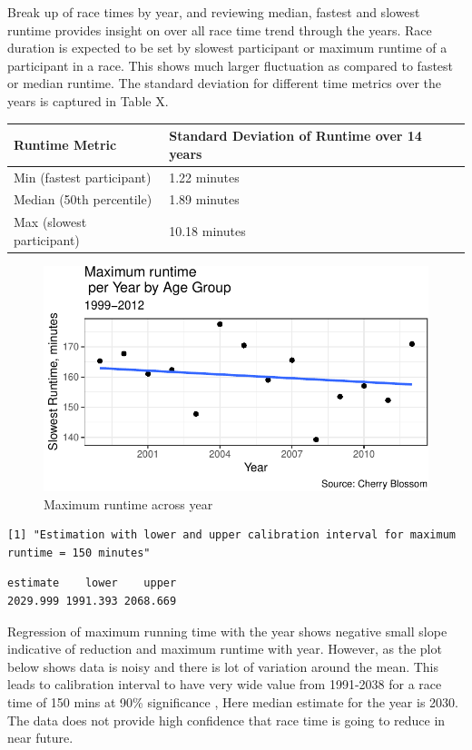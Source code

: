 \documentclass[
]{article}
\begin{document}
Break up of race times by year, and reviewing median, fastest and
slowest runtime provides insight on over all race time trend through the
years. Race duration is expected to be set by slowest participant or
maximum runtime of a participant in a race. This shows much larger
fluctuation as compared to fastest or median runtime. The standard
deviation for different time metrics over the years is captured in Table
X.

\begin{longtable}[]{@{}ll@{}}
\toprule
Runtime Metric & Standard Deviation of Runtime over 14
years\tabularnewline
\midrule
\endhead
Min (fastest participant) & 1.22 minutes\tabularnewline
Median (50th percentile) & 1.89 minutes\tabularnewline
Max (slowest participant) & 10.18 minutes\tabularnewline
\bottomrule
\end{longtable}

\begin{figure}[H]

{\centering \includegraphics{case_study02_files/figure-latex/unnamed-chunk-20-1} 

}

\caption{Maximum runtime across year}\label{fig:unnamed-chunk-20}
\end{figure}

\begin{verbatim}
[1] "Estimation with lower and upper calibration interval for maximum runtime = 150 minutes"
\end{verbatim}

\begin{verbatim}
estimate    lower    upper 
2029.999 1991.393 2068.669 
\end{verbatim}

Regression of maximum running time with the year shows negative small
slope indicative of reduction and maximum runtime with year. However, as
the plot below shows data is noisy and there is lot of variation around
the mean. This leads to calibration interval to have very wide value
from 1991-2038 for a race time of 150 mins at 90\% significance , Here
median estimate for the year is 2030. The data does not provide high
confidence that race time is going to reduce in near future.
\end{document}
